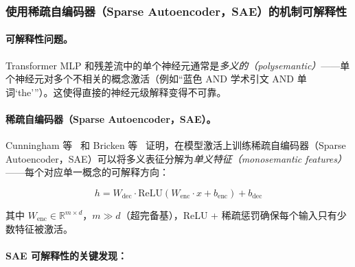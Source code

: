 \subsubsection{使用稀疏自编码器（Sparse Autoencoder，SAE）的机制可解释性}
\label{mechanistic-interpretability-with-sparse-autoencoders-saes}

\paragraph{可解释性问题。}
\label{the-interpretability-problem.}

Transformer MLP 和残差流中的单个神经元通常是\emph{多义的（polysemantic）}——单个神经元对多个不相关的概念激活（例如``蓝色 AND 学术引文 AND 单词`the'''）。这使得直接的神经元级解释变得不可靠。

\paragraph{稀疏自编码器（Sparse Autoencoder，SAE）。}
\label{sparse-autoencoders.}

Cunningham 等~\cite{cunningham2023sparse} 和 Bricken 等~\cite{bricken2023monosemanticity} 证明，在模型激活上训练稀疏自编码器（Sparse Autoencoder，SAE）可以将多义表征分解为\emph{单义特征（monosemantic features）}——每个对应单一概念的可解释方向：

\[
h = W_{\text{dec}} \cdot \text{ReLU}(W_{\text{enc}} \cdot x + b_{\text{enc}}) + b_{\text{dec}}
\]

其中 $W_{\text{enc}} \in \mathbb{R}^{m \times d}$，$m \gg d$（超完备基），ReLU + 稀疏惩罚确保每个输入只有少数特征被激活。

\paragraph{SAE 可解释性的关键发现：}
\label{key-findings-from-sae-interpretability}

